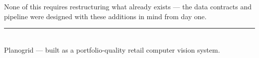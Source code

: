 \documentclass[11pt,a4paper]{article}
\begin{document}
None of this requires restructuring what already exists --- the data contracts and pipeline were
designed with these additions in mind from day one.

\vspace{18pt}
\begin{center}
{\color{brandgraylight}\rule{0.4\textwidth}{0.6pt}}\\[8pt]
{\small\color{brandgray}\headfont Planogrid --- built as a portfolio-quality retail computer
vision system.}
\end{center}
\end{document}
